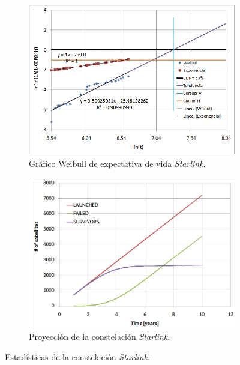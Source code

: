 \begin{figure}[htbp]
	\centering
    \begin{subfigure}{0.8\textwidth}
        \includegraphics[width=\textwidth]{./Figures/starlinkdeath.png}
        \caption{Gráfico Weibull de expectativa de vida \emph{Starlink}.}
        \label{fig:starlinkdeathA}
    \end{subfigure}
    \hfill
    \begin{subfigure}{0.8\textwidth}
        \includegraphics[width=\textwidth]{./Figures/starlinkpopulation.png}
        \caption{Proyección de la constelación \emph{Starlink}.}
        \label{fig:starlinkdeathB}
    \end{subfigure}
    \hfill
        \caption{Estadísticas de la constelación \emph{Starlink}\protect\footnotemark.}
        \label{fig:starlinkdeath}
\end{figure}

